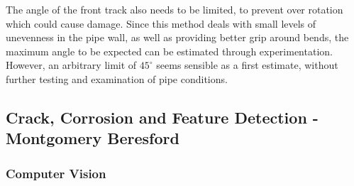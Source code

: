\documentclass[11pt]{article}		%
\begin{document}
			The angle of the front track also needs to be limited, to prevent over rotation which could cause damage.
			Since this method deals with small levels of unevenness in the pipe wall, as well as providing better grip around bends, the maximum angle to be expected can be estimated through experimentation.
			However, an arbitrary limit of $45^\circ$ seems sensible as a first estimate, without further testing and examination of pipe conditions.
				
		\subsection[Crack, Corrosion and Feature Detection]{Crack, Corrosion and Feature Detection - Montgomery Beresford} \label{featureDetection}
		
		\subsubsection{Computer Vision}
		
\end{document}
